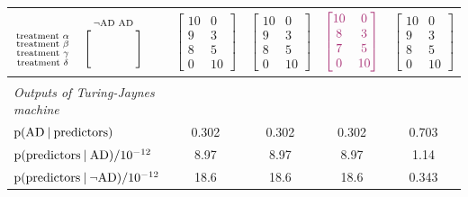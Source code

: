 \documentclass[utf8]{FrontiersinHarvard} %
\newcommand*{\p}{\mathrm{p}}%
\renewcommand*{\|}[1][]{\nonscript\:#1\vert\nonscript\:\mathopen{}}
\newcommand*{\tjm}{Turing-Jaynes machine}
\newcommand*{\AD}{\mathrm{AD}}
\newcommand*{\nAD}{\lnot\mathrm{AD}}
\begin{document}
\begin{table}[!t]
\begin{tabular}{lcccc}
    $
    \begin{matrix}
      &\begin{smallmatrix}\nAD&\AD\end{smallmatrix}\\
      \begin{smallmatrix}
      \text{treatment $\alpha$}\\
      \text{treatment $\beta$}\\
      \text{treatment $\gamma$}\\
      \text{treatment $\delta$}
    \end{smallmatrix}&
    \Biggl[\begin{smallmatrix}
      \hphantom{\nAD}&\hphantom{\AD}\\&\\&\\&
    \end{smallmatrix}\Biggr]
    \end{matrix}$
    &
    $\begin{bmatrix}10&0\\9&3\\8&5\\0&10\end{bmatrix}$
    &
    $\begin{bmatrix}10&0\\9&3\\8&5\\0&10\end{bmatrix}$
    &
    $\color{redpurple}\begin{bmatrix}10&0\\8&3\\7&5\\0&10\end{bmatrix}$
    &
    $\begin{bmatrix}10&0\\9&3\\8&5\\0&10\end{bmatrix}$
    \\[4\jot] \hline\\
    \emph{\small Outputs of \tjm}&&&& \\[2\jot]
    {\small $\p(\AD \| \text{predictors})$}&
    0.302&0.302&0.302&0.703
    \\
    {\small $\p(\text{predictors} \| \AD)/10^{-12}$}&
    8.97&8.97&8.97&1.14
    \\
    {\small $\p(\text{predictors} \| \nAD)/10^{-12}$}&
    18.6&18.6&18.6&0.343
    \\[\jot]

\end{tabular}
\end{table}
\end{document}
